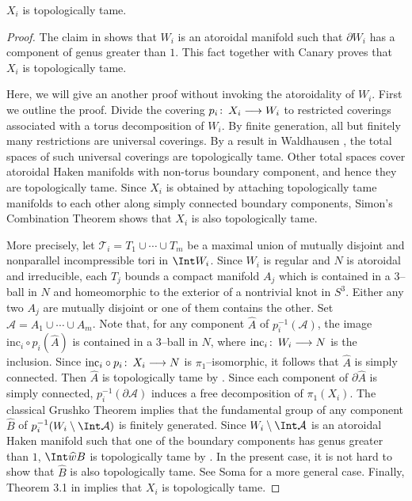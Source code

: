 \documentclass{gtart_a}
\theoremstyle{definition}
\numberwithin{equation}{section}
\begin{document}
\begin{lemma}\label{Tame}
$X_i$ is topologically tame.
\end{lemma}
\begin{proof}
The claim in \cite[page 426]{cg} shows that $W_i$ is an atoroidal manifold such that $\partial W_i$ has a component 
of genus greater than $1$.
This fact together with Canary \cite{can} proves that $X_i$ is topologically tame.


Here, we will give an another proof without invoking the atoroidality of $W_i$.
First we outline the proof.
Divide the covering $p_i\mskip0.5mu\colon\thinspace X_i\longrightarrow W_i$ to restricted coverings associated with a torus decomposition 
of $W_i$.
By finite generation, all but finitely many restrictions are universal coverings.
By a result in Waldhausen \cite{wa}, the total spaces of such universal coverings are topologically tame.
Other total spaces cover atoroidal Haken manifolds with non-torus boundary component, and hence they are 
topologically tame.
Since $X_i$ is obtained by attaching topologically tame manifolds to each other along simply connected boundary 
components, Simon's Combination Theorem \cite{sim} shows that $X_i$ is also topologically tame.

More precisely, let $\mathcal{T}_i=T_1\cup\cdots\cup T_m$ be a maximal union of mutually disjoint and nonparallel 
incompressible tori in $\Int W_i$.
Since $W_i$ is regular and $N$ is atoroidal and irreducible, each $T_j$ bounds a compact manifold $A_j$ which is 
contained in a $3$--ball in $N$ and homeomorphic to the exterior of a nontrivial knot in $S^3$.
Either any two $A_j$ are mutually disjoint or one of them contains the other.
Set $\mathcal{A}=A_1\cup\cdots\cup A_m$.
Note that, for any component $\hat A$ of $p_i^{-1}(\mathcal{A})$, the image $\mathrm{inc}_i\circ p_i(\hat A)$ 
is contained in a $3$--ball in $N$, where $\mathrm{inc}_i\mskip0.5mu\colon\thinspace W_i\longrightarrow N$ is the inclusion.
Since $\mathrm{inc}_i\circ p_i\mskip0.5mu\colon\thinspace X_i\longrightarrow N$ is $\pi_1$--isomorphic, it follows that $\hat A$ is simply 
connected.
Then $\hat A$ is topologically tame by \cite[Theorem 8.1]{wa}.
Since each component of $\partial \hat A$ is simply connected, $p_i^{-1}(\partial \mathcal{A})$ induces a 
free decomposition of $\pi_1(X_i)$.
The classical Grushko Theorem implies that the fundamental group of any component $\hat B$ of $
p_i^{-1}(W_i\setminus \Int \mathcal{A})$ is finitely generated.
Since $W_i\setminus \Int \mathcal{A}$ is an atoroidal Haken manifold such that one of the boundary 
components has genus greater than $1$, $\Int \hat B$ is topologically tame by \cite[Proposition 3.2]{can}.
In the present case, it is not hard to show that $\hat B$ is also topologically tame.
See Soma \cite{so} for a more general case.
Finally, Theorem 3.1 in \cite{sim} implies that $X_i$ is topologically tame.
\end{proof}
\end{document}
